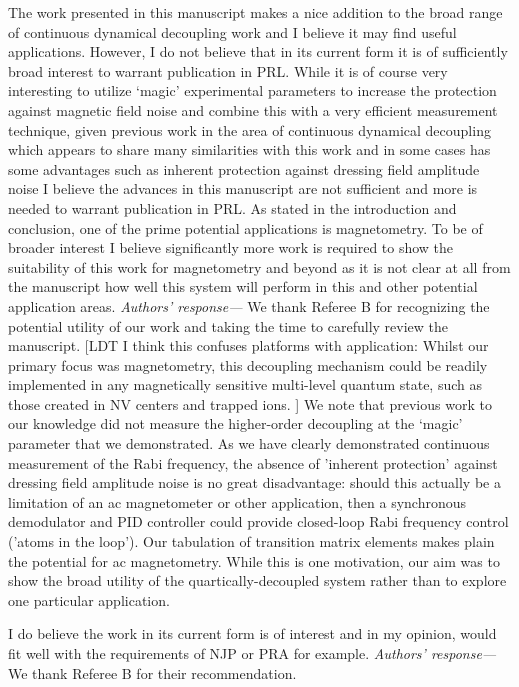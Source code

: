 \documentclass[letterpaper]{article}
\newenvironment{refcomment}{\singlespacing\verbatim}{\endverbatim}
\newcommand{\response}{\emph{Authors' response---}}
\begin{document}
\begin{refcomment}
The work presented in this manuscript makes a nice addition to the 
broad range of continuous dynamical decoupling work and I believe it 
may find useful applications. However, I do not believe that in its 
current form it is of sufficiently broad interest to warrant 
publication in PRL. While it is of course very interesting to utilize 
‘magic’ experimental parameters to increase the protection against
magnetic field noise and combine this with a very efficient 
measurement technique, given previous work in the area of continuous 
dynamical decoupling which appears to share many similarities with
this work and in some cases has some advantages such as inherent 
protection against dressing field amplitude noise I believe the 
advances in this manuscript are not sufficient and more is needed to
warrant publication in PRL. As stated in the introduction and 
conclusion, one of the prime potential applications is magnetometry. 
To be of broader interest I believe significantly more work is 
required to show the suitability of this work for magnetometry and 
beyond as it is not clear at all from the manuscript how well this 
system will perform in this and other potential application areas.
\end{refcomment}
\response 
We thank Referee B for recognizing the potential utility of our work and taking the time to carefully review the manuscript. 
[LDT I think this confuses platforms with application: 
Whilst our primary focus was magnetometry, this decoupling mechanism could be readily implemented in any magnetically sensitive multi-level quantum state, such as those created in NV centers and trapped ions.
]
We note that previous work to our knowledge did not measure the higher-order decoupling at the `magic' parameter that we demonstrated.
As we have clearly demonstrated continuous measurement of the Rabi frequency, the absence of 'inherent protection' against dressing field amplitude noise is no great disadvantage: should this actually be a limitation of an ac magnetometer or other application, then a synchronous demodulator and PID controller could provide closed-loop Rabi frequency control ('atoms in the loop').  
Our tabulation of transition matrix elements makes plain the potential for ac magnetometry. While this is one motivation, our aim was to show the broad utility of the quartically-decoupled system rather than to explore one particular application. 

\begin{refcomment}
I do believe the work in its current form is of interest and in my 
opinion, would fit well with the requirements of NJP or PRA for 
example.
\end{refcomment}
\response We thank Referee B for their recommendation.
\end{document}
